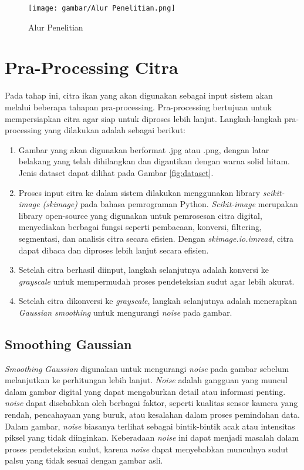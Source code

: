 \begin{figure}
    \centering
    \texttt{[image: gambar/Alur Penelitian.png]}
    \caption{Alur Penelitian}
    \label{Alur Penelitian}
\end{figure}

\section{Pra-Processing Citra}
    Pada tahap ini, citra ikan yang akan digunakan sebagai input sistem akan melalui beberapa tahapan pra-processing.
Pra-processing bertujuan untuk mempersiapkan citra agar siap untuk diproses lebih lanjut. Langkah-langkah pra-processing yang dilakukan adalah sebagai berikut:
\begin{enumerate}
    \item Gambar yang akan digunakan berformat .jpg atau .png, dengan latar belakang yang telah dihilangkan dan digantikan dengan warna solid hitam.  Jenis dataset dapat dilihat pada Gambar \ref{fig:dataset}.
    \item Proses input citra ke dalam sistem dilakukan menggunakan library \emph{scikit-image (skimage)} pada bahasa pemrograman Python. \emph{Scikit-image} merupakan library open-source yang digunakan untuk pemrosesan citra digital, menyediakan berbagai fungsi seperti pembacaan, konversi, filtering, segmentasi, dan analisis citra secara efisien. Dengan \emph{skimage.io.imread}, citra dapat dibaca dan diproses lebih lanjut secara efisien.
    \item Setelah citra berhasil diinput, langkah selanjutnya adalah konversi ke \emph{grayscale} untuk mempermudah proses pendeteksian sudut agar lebih akurat.
    \item Setelah citra dikonversi ke \emph{grayscale}, langkah selanjutnya adalah menerapkan \emph{Gaussian smoothing} untuk mengurangi \emph{noise} pada gambar.
\end{enumerate}


\subsection{Smoothing Gaussian}
    \emph{Smoothing Gaussian} digunakan untuk mengurangi \emph{noise} pada gambar sebelum melanjutkan ke perhitungan lebih lanjut.
\emph{Noise} adalah gangguan yang muncul dalam gambar digital yang dapat mengaburkan detail atau informasi penting. \emph{noise} dapat disebabkan oleh berbagai faktor, seperti kualitas sensor kamera yang rendah, pencahayaan yang buruk, atau kesalahan dalam proses pemindahan data.
Dalam gambar, \emph{noise} biasanya terlihat sebagai bintik-bintik acak atau intensitas piksel yang tidak diinginkan. Keberadaan \emph{noise} ini dapat menjadi masalah dalam proses pendeteksian sudut, karena \emph{noise} dapat menyebabkan munculnya sudut palsu yang tidak sesuai dengan gambar asli.
    

